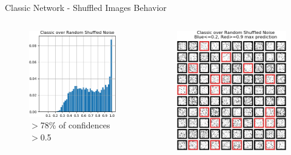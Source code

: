\documentclass{beamer}
\begin{document}
\begin{frame}{Classic Network - Shuffled Images Behavior}

    \begin{columns}
    \begin{column}{.5\textwidth}
    \begin{figure}
        \centering
        \includegraphics[width=.82\textwidth]{images/mnist-behavior/classic-hist-shuffled.png}
        \caption*{ $>$78\% of confidences $>$0.5}
    \end{figure}
    \end{column}
    \begin{column}{.5\textwidth}
    \begin{figure}
        \raggedright
        \vspace{-3mm}
        \includegraphics[width=.73\textwidth]{images/mnist-behavior/classic-pred-shuffled.png}
        \caption*{}
    \end{figure}
    \end{column}
    \end{columns}
    
\end{frame}
\end{document}

